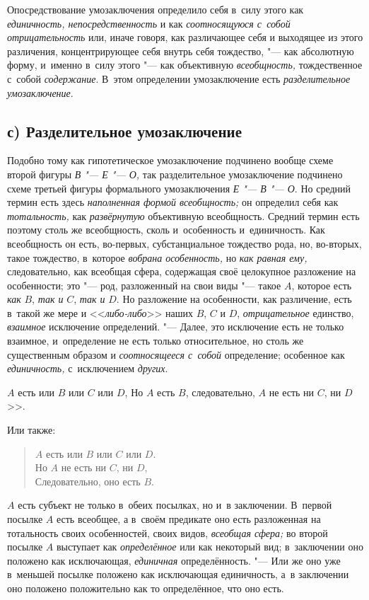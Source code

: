 Опосредствование умозаключения определило себя в~силу этого
как {\em единичность, непосредственность} и
как {\em соотносящуюся с~собой
отрицательность} или, иначе говоря, как различающее себя и
выходящее из этого различения, концентрирующее себя внутрь себя тождество,
"--- как абсолютную форму, и~именно в~силу этого "--- как объективную
{\em всеобщность,} тождественное с~собой {\em содержание}. В~этом
определении умозаключение есть {\em разделительное умозаключение}.

\subsection[с) Разделительное умозаключение]{с) Разделительное умозаключение}

Подобно тому как гипотетическое умозаключение подчинено вообще
схеме второй фигуры {\em В "--- Е "--- О,} так разделительное
умозаключение подчинено схеме третьей фигуры формального умозаключения
{\em Е "--- В "--- О}. Но средний термин есть здесь
{\em наполненная формой всеобщность;}
он определил себя как {\em тотальность,} как {\em развёрнутую}
объективную всеобщность. Средний термин есть поэтому столь же
всеобщность, сколь и~особенность и~единичность. Как всеобщность он есть,
во-первых, субстанциальное тождество рода, но, во-вторых, такое тождество,
в~которое {\em вобрана особенность,} но {\em как равная ему,}
следовательно, как всеобщая сфера, содержащая своё целокупное
разложение на особенности; это "--- род, разложенный на свои
виды "--- такое $A$,
которое есть {\em как} $B$, {\em так и} $C$, {\em так и} $D$. Но
разложение на особенности, как различение, есть в~такой же мере и
<<{\em либо-либо}>> наших $B$, $C$ и $D$, {\em отрицательное}
единство, {\em взаимное} исключение определений. "--- Далее, это
исключение есть не только взаимное, и~определение не есть только
относительное, но столь же существенным образом и {\em соотносящееся с~собой}
определение; особенное как {\em единичность,} с~исключением {\em других}.

$A$ есть или $B$ или $C$ или $D$,
Но $A$ есть $B$, следовательно, $A$ не есть ни $C$, ни $D$>>.

Или также:

\begin{verse}
$A$ есть или $B$ или $C$ или $D$.\\
Но $A$ не есть ни $C$, ни $D$,\\
Следовательно, оно есть $B$.
\end{verse}

$A$ есть субъект не только в~обеих посылках, но и~в заключении.
В~первой посылке $A$ есть всеобщее, а
в~своём предикате оно есть разложенная на тотальность своих особенностей,
своих видов, {\em всеобщая сфера;} во второй посылке $A$
выступает как {\em определённое} или
как некоторый вид; в~заключении оно положено как исключающая, {\em единичная}
определённость. "--- Или же оно уже в~меньшей
посылке положено как исключающая единичность, а~в заключении оно положено
положительно как то определённое, что оно есть.

